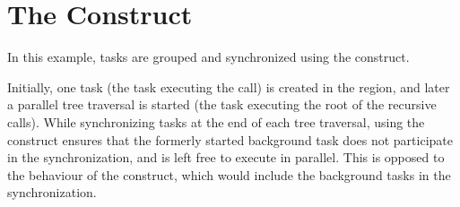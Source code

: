 \pagebreak
\chapter{The  Construct}
\label{chap:taskgroup}

In this example, tasks are grouped and synchronized using the  
construct.

Initially, one task (the task executing the  
call) is created in the  region, and later a parallel tree traversal 
is started (the task executing the root of the recursive  
calls). While synchronizing tasks at the end of each tree traversal, using the 
 construct ensures that the formerly started background task 
does not participate in the synchronization, and is left free to execute in parallel. 
This is opposed to the behaviour of the  construct, which would 
include the background tasks in the synchronization.




